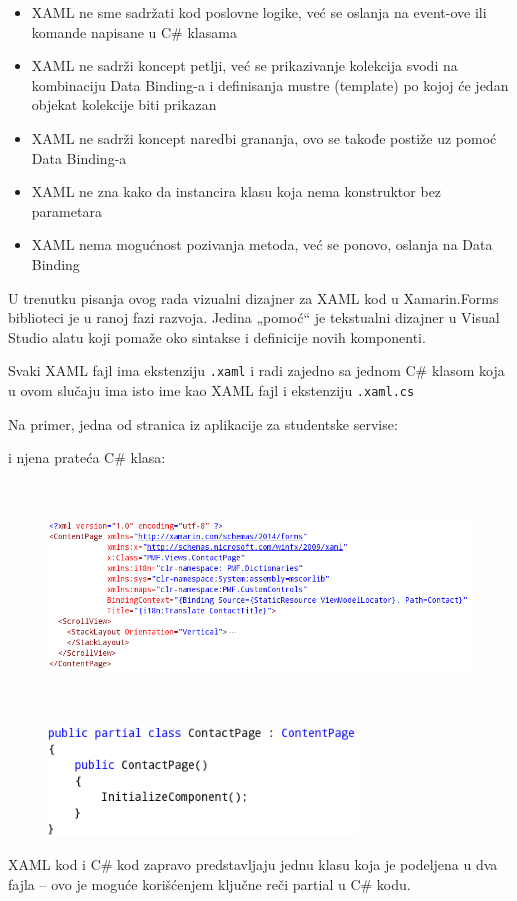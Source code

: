 \documentclass[a4paper]{article}
\newcommand\liststyleLvi{%
\renewcommand\labelitemi{•}
\renewcommand\labelitemii{◦}
\renewcommand\labelitemiii{${\blacksquare}$}
\renewcommand\labelitemiv{•}
}
\begin{document}
\liststyleLvi
\begin{itemize}
\item XAML ne sme sadržati kod poslovne logike, već se oslanja na
event-ove ili komande napisane u C\# klasama
\item XAML ne sadrži koncept petlji, već se prikazivanje kolekcija svodi
na kombinaciju Data Binding-a i definisanja mustre (template) po kojoj
će jedan objekat kolekcije biti prikazan
\item XAML ne sadrži koncept naredbi grananja, ovo se takođe postiže uz
pomoć Data Binding-a
\item XAML ne zna kako da instancira klasu koja nema konstruktor bez
parametara
\item XAML nema mogućnost pozivanja metoda, već se ponovo, oslanja na
Data Binding
\end{itemize}
U trenutku pisanja ovog rada vizualni dizajner za XAML kod u
Xamarin.Forms biblioteci je u ranoj fazi razvoja. Jedina „pomoć“ je
tekstualni dizajner u Visual Studio alatu koji pomaže oko sintakse i
definicije novih komponenti.

Svaki XAML fajl ima ekstenziju
\texttt{\textcolor[rgb]{0.0,0.4,0.8}{.xaml}} i radi zajedno sa jednom
C\# klasom koja u ovom slučaju ima isto ime kao XAML fajl i ekstenziju
\texttt{\textcolor[rgb]{0.0,0.4,0.8}{.xaml.cs}}

Na primer, jedna od stranica iz aplikacije za studentske servise:

i njena prateća C\# klasa:

\begin{figure}
\centering
\includegraphics[width=168.08mm,height=60.08mm]{msc-img13.png}
\end{figure}


\begin{figure}
\centering
\includegraphics[width=82.16mm,height=28.93mm]{msc-img14.png}
\end{figure}
XAML kod i C\# kod zapravo predstavljaju jednu klasu koja je podeljena u
dva fajla – ovo je moguće korišćenjem ključne reči partial u C\# kodu.
\end{document}
